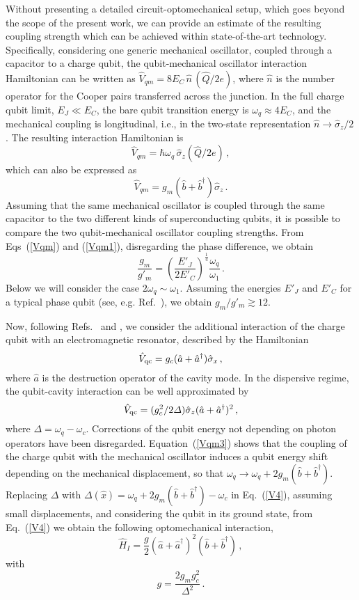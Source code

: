 \documentclass[aps,pra,twocolumn,floatfix,longbibliography, superscriptaddress]{revtex4-1}
\newcommand{\be}{\begin{equation}}
\newcommand{\ee}{\end{equation}}
\begin{document}
Without presenting a detailed circuit-optomechanical setup, which goes beyond the scope of the present work, we can provide an estimate of the resulting coupling strength which can be achieved within state-of-the-art technology.
Specifically, considering one generic mechanical oscillator, coupled through a capacitor to a charge qubit, the  qubit-mechanical oscillator interaction Hamiltonian can be  written as $\hat V_{qm} = 8 E_C\, \hat n\, (\hat Q/2e)$, where 
$\hat n$ is the number operator for the Cooper pairs transferred across the junction. In the full charge qubit limit, $E_J \ll E_C$, the bare qubit transition energy is $\omega_q \approx 4 E_C$, and the mechanical coupling is longitudinal, i.e., in the two-state representation $\hat n \to \hat \sigma_z/2$. The resulting
interaction Hamiltonian is
\be\label{Vqm1}
\hat V_{qm} =  \hbar \omega_q\, \hat \sigma_z  (\hat Q/2e)\, ,
\ee
which can also be expressed as
\be\label{Vqm3}
\hat V_{qm} = g_m (\hat b+ \hat b^\dag) \hat \sigma_z\, .
\ee
Assuming that the same mechanical oscillator is coupled through the same capacitor to the two different kinds of superconducting qubits, it is possible to compare the two qubit-mechanical oscillator coupling strengths. From Eqs~(\ref{Vqm}) and (\ref{Vqm1}), disregarding the phase difference, we obtain
\be 
\frac{g_m}{g'_m} =   \left(\frac{ E'_J}{2E'_C}\right)^{\frac{1}{4}}
\frac{ \omega_q}{\omega_1}\, .
\ee
Below we will consider the case $2 \omega_q \sim \omega_1$. Assuming the energies $E'_J$ and $E'_C$ for a typical phase qubit (see, e.g. Ref.~\cite{Cleland2004}), we obtain $g_m /g'_m  \gtrsim 12$.


Now, following Refs.~\cite{Heikkila2014} and \cite{Pirkkalainen2015}, we consider the additional interaction of the charge qubit with an electromagnetic resonator, described by the Hamiltonian
\be
\hat V_{\rm qc} = g_c (\hat a+ \hat a^\dag) \hat \sigma_x\, ,
\ee
where $\hat a$ is the destruction operator of the cavity mode.
In the dispersive regime,  the qubit-cavity interaction can be well approximated by \cite{Zueco2009}
\be\label{V4}
\hat V_{\rm qc} = (g^2_c / 2 \Delta) \hat \sigma_z (\hat a +\hat a^\dagger)^2\, ,
\ee
where $\Delta = \omega_q -\omega_c$.  Corrections of the qubit energy not depending on photon operators have been disregarded. Equation~(\ref{Vqm3}) shows that the coupling of the charge qubit with the mechanical oscillator induces a qubit energy shift depending on the mechanical displacement, so that $\omega_q \to \omega_q + 2 g_m (\hat b + \hat b^\dag)$. Replacing $\Delta$ with $\Delta(\hat x) = \omega_q + 2 g_m (\hat b + \hat b^\dag) - \omega_c$ in Eq.~(\ref{V4}), assuming small displacements, and considering the qubit in its ground state, from Eq.~(\ref{V4}) we obtain the following optomechanical interaction,
\be 
\hat H_I = \frac{g}{2} (\hat a +\hat a^\dagger)^2 (\hat b + \hat b^\dag)\, ,
\ee
with
\be g = \frac{2 g_m g_c^2}{\Delta^2}\, .
\ee
\end{document}
